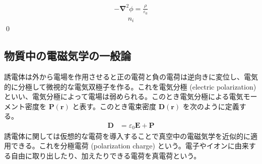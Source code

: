 \documentclass[uplatex,dvipdfmx,a4paper,11pt]{jlreq}
\makeatletter
\newcommand{\EE}{\bm{E}}
\newcommand{\DD}{\bm{D}}
\newcommand{\PP}{\bm{P}}
\newcommand{\rr}{\bm{r}}
\newcommand{\vnabla}{\mathbf{\nabla}}
\numberwithin{equation}{section}
\theoremstyle{definition}
\renewenvironment{proof}[1][\proofname]{\par
  \normalfont
  \topsep6\p@\@plus6\p@ \trivlist
  \item[\hskip\labelsep{\bfseries #1}\@addpunct{\bfseries}]\ignorespaces\quad\par
}{%
  \qed\endtrivlist\@endpefalse
}
\renewcommand\proofname{証明}
\makeatother
\begin{document}
\begin{theorem}[表面電荷による遮蔽]
\end{theorem}
\begin{proof}
  \begin{align}
    -\vnabla^2\phi = \frac{\rho}{\varepsilon_0}
  \end{align}
  \begin{align}
    n_i
  \end{align}
\end{proof}


\subsection{物質中の電磁気学の一般論}
\begin{definition}[誘電体]
  誘電体は外から電場を作用させると正の電荷と負の電荷は逆向きに変位し、電気的に分極して微視的な電気双極子を作る。これを電気分極 (electric polarization) といい、電気分極によって電場は弱められる。このとき電気分極による電気モーメント密度を $\PP(\rr)$ と表す。このとき電束密度 $\DD(\rr)$ を次のように定義する。
  \begin{align}
    \DD & = \varepsilon_0\EE + \PP
  \end{align}
  誘電体に関しては仮想的な電荷を導入することで真空中の電磁気学を近似的に適用できる。これを分極電荷 (polarization charge) という。電子やイオンに由来する自由に取り出したり、加えたりできる電荷を真電荷という。
\end{definition}
\end{document}

